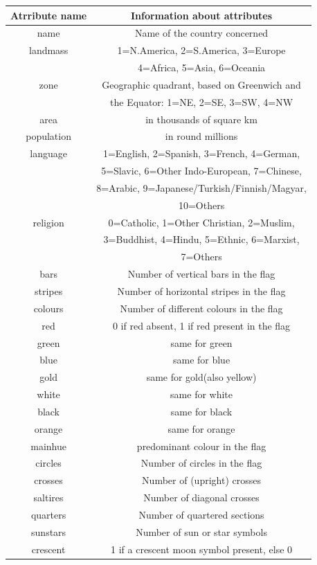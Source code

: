 \documentclass[conference]{IEEEtran}
\begin{document}
\begin{table}[htbp]
\begin{center}
\begin{tabular}{ |c|c| } 
 \hline
 Atrribute name & Information about attributes \\
 \hline
 name & Name of the country concerned \\ 
 \hline
 landmass &	1=N.America, 2=S.America, 3=Europe\\
 & 4=Africa, 5=Asia, 6=Oceania \\
 \hline
 zone & Geographic quadrant, based on Greenwich and \\& the Equator:
                		1=NE, 2=SE, 3=SW, 4=NW \\ 
 \hline
 area & in thousands of square km\\
 \hline
 population & in round millions\\
 \hline
 language & 1=English, 2=Spanish, 3=French, 4=German,\\& 5=Slavic, 6=Other 
               		Indo-European, 7=Chinese,\\& 8=Arabic, 
               		9=Japanese/Turkish/Finnish/Magyar,\\& 10=Others\\
 \hline
 religion & 0=Catholic, 1=Other Christian, 2=Muslim,\\& 3=Buddhist, 4=Hindu,
               		5=Ethnic, 6=Marxist,\\& 7=Others\\
 \hline
 bars & Number of vertical bars in the flag\\
 \hline
 stripes & Number of horizontal stripes in the flag\\
 \hline
 colours & Number of different colours in the flag\\
 \hline
 red & 0 if red absent, 1 if red present in the flag\\
 \hline
 green & same for green\\
 \hline
 blue & same for blue\\
 \hline
 gold & same for gold(also yellow)\\
 \hline
 white & same for white\\
 \hline
 black & same for black\\
 \hline
 orange & same for orange\\
 \hline
 mainhue & predominant colour in the flag\\ 
 \hline
 circles & Number of circles in the flag\\
 \hline
 crosses & Number of (upright) crosses\\
 \hline
 saltires & Number of diagonal crosses\\
 \hline
 quarters & Number of quartered sections\\
 \hline
 sunstars & Number of sun or star symbols\\
 \hline
 crescent & 1 if a crescent moon symbol present, else 0\\
 \hline
 \end{tabular}
\end{center}
\end{table}
\end{document}
